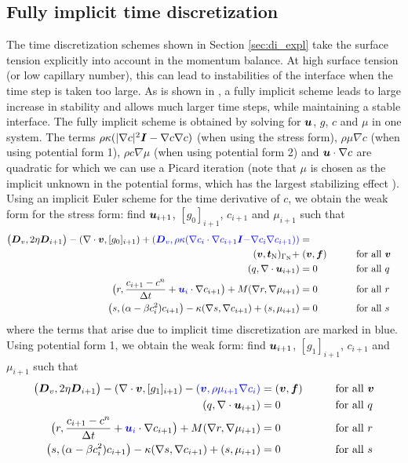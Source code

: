 \subsection{Fully implicit time discretization}
The time discretization schemes shown in Section \ref{sec:di_expl} take the 
surface tension explicitly into account in the momentum balance. At high 
surface tension (or low capillary number), this can lead to instabilities of 
the interface when the time step is taken too large. As is shown in 
\cite{Aland2014}, a fully implicit scheme leads to large increase in stability 
and allows 
much larger time steps, while maintaining a stable interface. The fully 
implicit scheme is obtained by solving for $\boldsymbol{u}$, $g$, $c$ and $\mu$ in one 
system. The terms $\rho \kappa (|\nabla c|^2 \boldsymbol{I} 
- \nabla c \nabla c)$ (when using the stress form), $\rho \mu \nabla c$ (when 
using potential form 1), $\rho c \nabla \mu$ (when 
using potential form 2) and $\boldsymbol{u} \cdot 
\nabla c$ are quadratic for which we can use a Picard iteration (note that 
$\mu$ is chosen as the implicit unknown in the potential forms, which has the 
largest stabilizing effect \cite{Aland2014}).
Using an implicit Euler scheme for the time derivative of $c$, we obtain the 
weak form for the stress form:
find $\boldsymbol{u}_{i+1}$, $[g_0]_{i+1}$, $c_{i+1}$ and $\mu_{i+1}$ such that
\begin{align*}
\big(\boldsymbol{D}_v,2\eta \boldsymbol{D}_{i+1} \big) - (\nabla\cdot\boldsymbol{v},[g_0]_{i+1})
+\textcolor{blue}{(\boldsymbol{D}_v, \rho \kappa(\nabla c_i \cdot \nabla c_{i+1} 
	\boldsymbol{I} } \textcolor{blue}{- \nabla c_i \nabla c_{i+1}))}&= \\
(\boldsymbol{v},\boldsymbol{t}_{\text{N}})_{\Gamma_{\text{N}}}+&\;(\boldsymbol{v}, \boldsymbol{f})
&\qquad&\text{for all }\boldsymbol{v}\\
(q,\nabla\cdot\boldsymbol{u}_{i+1})&=0&\qquad&\text{for all }q\\
\big(r,\frac{c_{i+1}-c^n}{\Delta t}+\textcolor{blue}{\boldsymbol{u}_i}\cdot\nabla c_{i+1}\big)
+M(\nabla r,\nabla \mu_{i+1})&=0&\qquad&\text{for all } r\\
\big(s, (\alpha -\beta c_{i}^2)c_{i+1}\big)-\kappa(\nabla s,\nabla c_{i+1}) 
+(s,\mu_{i+1})&=0&\qquad&\text{for all }s
\end{align*}
where the  
terms that arise due to implicit time discretization are marked in blue. Using 
potential form 1, we obtain the weak form:
find $\boldsymbol{u}_{i+1}$, $[g_1]_{i+1}$, $c_{i+1}$ and $\mu_{i+1}$ such that
\begin{alignat*}{6}
\big(\boldsymbol{D}_v,2\eta \boldsymbol{D}_{i+1} \big) -(\nabla\cdot\boldsymbol{v},[g_1]_{i+1})
-\textcolor{blue}{( \boldsymbol{v}, \rho \mu_{i+1}\nabla c_{i})}&=(\boldsymbol{v}, \boldsymbol{f})
&\qquad&\text{for all }\boldsymbol{v}\\
(q,\nabla\cdot\boldsymbol{u}_{i+1})&=0&\qquad&\text{for all }q \\
\big(r,\frac{c_{i+1}-c^n}{\Delta t}+\textcolor{blue}{\boldsymbol{u}_i}\cdot\nabla c_{i+1}\big)
+M(\nabla r,\nabla \mu_{i+1})&=0 &\qquad&\text{for all } r\\
\big(s, (\alpha -\beta c_{i}^2)c_{i+1}\big)-\kappa(\nabla s,\nabla c_{i+1}) 
+(s,\mu_{i+1})&=0&\qquad&\text{for all } s
\end{alignat*}
